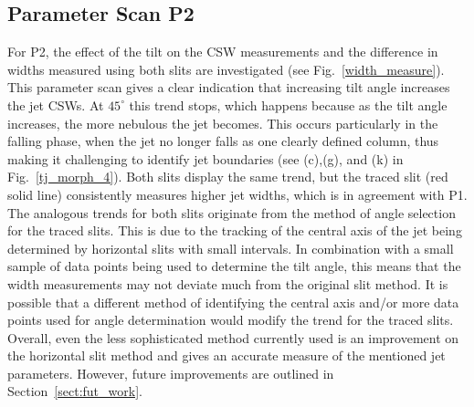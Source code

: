 \subsection{Parameter Scan P2}
\label{subsec:pscansII_II}
For P2, the effect of the tilt on the CSW measurements and the difference in widths measured using both slits are investigated (see Fig.~\ref{width_measure}). This parameter scan gives a clear indication that increasing tilt angle increases the jet CSWs. At $45^{\circ}$ this trend stops, which happens because as the tilt angle increases, the more nebulous the jet becomes. This occurs particularly in the falling phase, when the jet no longer falls as one clearly defined column, thus making it challenging to identify jet boundaries (see (c),(g), and (k) in Fig.~\ref{tj_morph_4}). Both slits display the same trend, but the traced slit (red solid line) consistently measures higher jet widths, which is in agreement with P1. The analogous trends for both slits originate from the method of angle selection for the traced slits. This is due to the tracking of the central axis of the jet being determined by horizontal slits with small intervals. In combination with a small sample of data points being used to determine the tilt angle, this means that the width measurements may not deviate much from the original slit method. It is possible that a different method of identifying the central axis and/or more data points used for angle determination would modify the trend for the traced slits. Overall, even the less sophisticated method currently used is an improvement on the horizontal slit method and gives an accurate measure of the mentioned jet parameters. However, future improvements are outlined in Section~\ref{sect:fut_work}. \np
